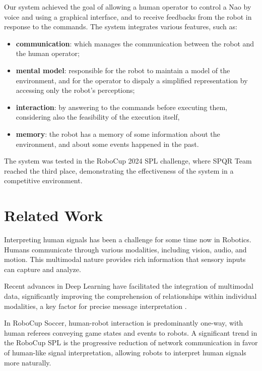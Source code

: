 \documentclass[a4paper, onecolumn, 12pt]{article}
\begin{document}
Our system achieved the goal of allowing a human operator to control a Nao
by voice and using a graphical interface, and to receive feedbacks from the robot
in response to the commands. The system integrates various features, such as:
\begin{itemize}
    \item \textbf{communication}: which manages the communication between the robot and
    the human operator;
    \item \textbf{mental model}: responsible for the robot to maintain a model of 
    the environment, and for the operator to dispaly a simplified representation by
    accessing only the robot's perceptions;
    \item \textbf{interaction}: by answering to the commands before executing
    them, considering also the feasibility of the execution itself,
    \item \textbf{memory}: the robot has a memory of some information about the 
    environment, and about some events happened in the past.
\end{itemize}
The system was tested in the RoboCup 2024 SPL challenge, where SPQR Team reached
the third place, demonstrating the effectiveness of the system in a competitive
environment.

\newpage

\section{Related Work}
\label{sec:rel}

Interpreting human signals has been a challenge for some time now in Robotics.
Humans communicate through various modalities, including vision, audio, and
motion. This multimodal nature provides rich information that sensory inputs can
capture and analyze. 

Recent advances in Deep Learning have facilitated the
integration of multimodal data, significantly improving the comprehension of
relationships within individual modalities, a key factor for precise message
interpretation \cite{LIU20183} \cite{su2023recent}.

In RoboCup Soccer, human-robot interaction is predominantly one-way, with human
referees conveying game states and events to robots. A significant trend in the
RoboCup SPL is the progressive reduction of network communication in
favor of human-like signal interpretation, allowing robots to interpret human
signals more naturally. \cite{digiambattista}
\end{document}
